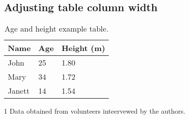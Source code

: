 		\subsection{Adjusting table column width}

\begingroup
\renewcommand{\arraystretch}{1.5}
\begin{table}[h]
	\begin{center}
		\begin{threeparttable}[h]
			\caption{Age and height example table.}
			\label{tab:exampleTable}
			\begin{tabular}{m{3cm}<{\raggedright} p{3cm}<{\centering} p{3cm}<{\centering} }
				\toprule
				\textbf{Name}\tnote{1} & \textbf{Age} & \textbf{Height (m)} \\
				\midrule
				John & 25 & 1.80\\
				Mary & 34 & 1.72\\
				Janett & 14 & 1.54\\
				\bottomrule
			\end{tabular}
			\begin{tablenotes}[flushleft]
				\item[1] Data obtained from volunteers inteervewed by the authors.
			\end{tablenotes}
		\end{threeparttable}
	\end{center}
\end{table}
\endgroup
